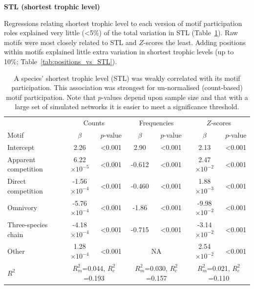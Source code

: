 \documentclass[12pt]{article}
\begin{document}
\begin{spacing}{2.0}
		\textbf{STL (shortest trophic level)}

			Regressions relating shortest trophic level to each version of motif participation roles explained very little (\textless5\%) of the total variation in STL (Table~\ref{tab:motifs_vs_STL}). 
			Raw motifs were most closely related to STL and $Z$-scores the least.
            Adding positions within motifs explained little extra variation in shortest trophic levels (up to 10\%; Table~\ref{tab:positions_vs_STL}).

			\begin{table}[hb!]
    			\caption{A species' shortest trophic level (STL) was weakly correlated with its motif participation. This association was strongest for un-normalised (count-based) motif participation. Note that $p$-values depend upon sample size and that with a large set of simulated networks it is easier to meet a significance threshold.}
    			\label{tab:motifs_vs_STL}
    			\begin{tabular}{l | c c | c c | c c}
    			& \multicolumn{2}{c|}{Counts} & \multicolumn{2}{c|}{Frequencies} & \multicolumn{2}{c}{$Z$-scores} \\
    			Motif & $\beta$ & $p$-value & $\beta$ & $p$-value & $\beta$ & $p$-value \\
    			\hline
    			Intercept & 2.26 & \textless0.001 & 2.90 & \textless0.001 & 2.13 & \textless0.001 \\
    			\hline
    			Apparent competition & 6.22$\times10^{-5}$ & \textless0.001 & -0.612 & \textless0.001 & 2.47$\times10^{-2}$ & \textless0.001 \\
    			Direct competition   & -1.56$\times10^{-4}$ & \textless0.001 & -0.460 & \textless0.001 & 1.88$\times10^{-3}$ & \textless0.001 \\
    			Omnivory       & -5.76$\times10^{-4}$ & \textless0.001 & -1.86 & \textless0.001 & -9.98$\times10^{-2}$ & \textless0.001 \\
    			Three-species chain  & -4.18$\times10^{-4}$ & \textless0.001 & -0.715 & \textless0.001 & -3.14$\times10^{-2}$ & \textless0.001 \\
    			Other    & 1.28$\times10^{-4}$ & \textless0.001 & \multicolumn{2}{c|}{NA} & 2.54$\times10^{-2}$ & \textless0.001 \\
    			\hline
    			$R^2$ & \multicolumn{2}{c|}{\tiny{$R^2_m$=0.044, $R^2_c$=0.193}} & 
    			\multicolumn{2}{c|}{\tiny{$R^2_m$=0.030, $R^2_c$=0.157}} & 
    			\multicolumn{2}{c}{\tiny{$R^2_m$=0.021, $R^2_c$=0.110}} \\
    			\end{tabular}
    			\end{table}



\end{spacing}
\end{document}
